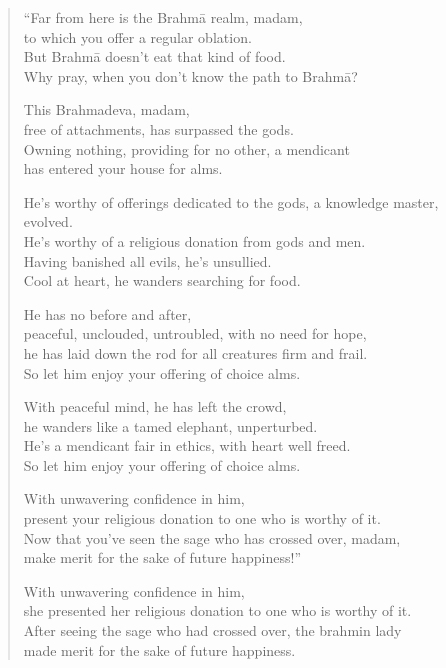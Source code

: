 \documentclass[12pt,openany]{book}%
\begin{document}
\begin{verse}%
“Far from here is the \textsanskrit{Brahmā} realm, madam, \\
to which you offer a regular oblation. \\
But \textsanskrit{Brahmā} doesn’t eat that kind of food. \\
Why pray, when you don’t know the path to \textsanskrit{Brahmā}? 

This Brahmadeva, madam, \\
free of attachments, has surpassed the gods. \\
Owning nothing, providing for no other, a mendicant \\
has entered your house for alms. 

He’s worthy of offerings dedicated to the gods, a knowledge master, evolved. \\
He’s worthy of a religious donation from gods and men. \\
Having banished all evils, he’s unsullied. \\
Cool at heart, he wanders searching for food. 

He has no before and after, \\
peaceful, unclouded, untroubled, with no need for hope, \\
he has laid down the rod for all creatures firm and frail. \\
So let him enjoy your offering of choice alms. 

With peaceful mind, he has left the crowd, \\
he wanders like a tamed elephant, unperturbed. \\
He’s a mendicant fair in ethics, with heart well freed. \\
So let him enjoy your offering of choice alms. 

With unwavering confidence in him, \\
present your religious donation to one who is worthy of it. \\
Now that you’ve seen the sage who has crossed over, madam, \\
make merit for the sake of future happiness!” 

With unwavering confidence in him, \\
she presented her religious donation to one who is worthy of it. \\
After seeing the sage who had crossed over, the brahmin lady \\
made merit for the sake of future happiness. 

%
\end{verse}
\end{document}
